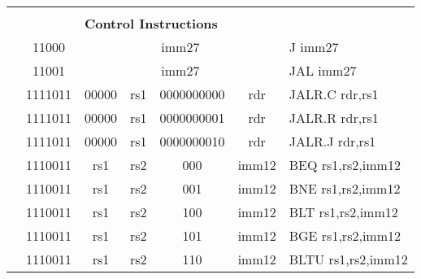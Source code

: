 \begin{table}[p]
\begin{small}
\begin{center}
\begin{tabular}{rcccccccccl}
&
\multicolumn{9}{c}{} & \\
&
\multicolumn{9}{c}{\bf Control Instructions} & \\
\cline{2-10}
  

&
\multicolumn{1}{|c|}{11000} &
\multicolumn{8}{c|}{imm27} & J imm27 \\
\cline{2-10}
  

&
\multicolumn{1}{|c|}{11001} &
\multicolumn{8}{c|}{imm27} & JAL imm27 \\
\cline{2-10}
  

&
\multicolumn{2}{|c|}{1111011} &
\multicolumn{1}{c|}{00000} &
\multicolumn{1}{c|}{rs1} &
\multicolumn{4}{c|}{0000000000} &
\multicolumn{1}{c|}{rdr} & JALR.C rdr,rs1 \\
\cline{2-10}
  

&
\multicolumn{2}{|c|}{1111011} &
\multicolumn{1}{c|}{00000} &
\multicolumn{1}{c|}{rs1} &
\multicolumn{4}{c|}{0000000001} &
\multicolumn{1}{c|}{rdr} & JALR.R rdr,rs1 \\
\cline{2-10}
  

&
\multicolumn{2}{|c|}{1111011} &
\multicolumn{1}{c|}{00000} &
\multicolumn{1}{c|}{rs1} &
\multicolumn{4}{c|}{0000000010} &
\multicolumn{1}{c|}{rdr} & JALR.J rdr,rs1 \\
\cline{2-10}
  

&
\multicolumn{2}{|c|}{1110011} &
\multicolumn{1}{c|}{rs1} &
\multicolumn{1}{c|}{rs2} &
\multicolumn{1}{c|}{000} &
\multicolumn{4}{c|}{imm12} & BEQ rs1,rs2,imm12 \\
\cline{2-10}
  

&
\multicolumn{2}{|c|}{1110011} &
\multicolumn{1}{c|}{rs1} &
\multicolumn{1}{c|}{rs2} &
\multicolumn{1}{c|}{001} &
\multicolumn{4}{c|}{imm12} & BNE rs1,rs2,imm12 \\
\cline{2-10}
  

&
\multicolumn{2}{|c|}{1110011} &
\multicolumn{1}{c|}{rs1} &
\multicolumn{1}{c|}{rs2} &
\multicolumn{1}{c|}{100} &
\multicolumn{4}{c|}{imm12} & BLT rs1,rs2,imm12 \\
\cline{2-10}
  

&
\multicolumn{2}{|c|}{1110011} &
\multicolumn{1}{c|}{rs1} &
\multicolumn{1}{c|}{rs2} &
\multicolumn{1}{c|}{101} &
\multicolumn{4}{c|}{imm12} & BGE rs1,rs2,imm12 \\
\cline{2-10}
  

&
\multicolumn{2}{|c|}{1110011} &
\multicolumn{1}{c|}{rs1} &
\multicolumn{1}{c|}{rs2} &
\multicolumn{1}{c|}{110} &
\multicolumn{4}{c|}{imm12} & BLTU rs1,rs2,imm12 \\
\cline{2-10}
  


\end{tabular}
\end{center}
\end{small}
\end{table}
